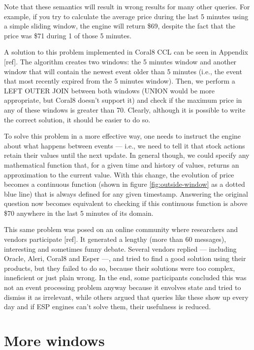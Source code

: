 \documentclass{report}
\begin{document}
Note that these semantics will result in wrong results for many other
queries. For example, if you try to calculate the average price during
the last 5 minutes using a simple sliding window, the engine will
return \$69, despite the fact that the price was \$71 during 1 of
those 5 minutes.

A solution to this problem implemented in Coral8 CCL can be seen in
Appendix [ref]. The algorithm creates two windows: the 5 minutes
window and another window that will contain the newest event older
than 5 minutes (i.e., the event that most recently expired from the 5
minutes window). Then, we perform a LEFT OUTER JOIN between both
windows (UNION would be more appropriate, but Coral8 doesn't support
it) and check if the maximum price in any of these windows is greater
than 70. Clearly, although it is possible to write the correct
solution, it should be easier to do so.

To solve this problem in a more effective way, one needs to instruct
the engine about what happens between events --- i.e., we need to tell
it that stock actions retain their values until the next update. In
general though, we could specify any mathematical function that, for a
given time and history of values, returns an approximation to the
current value. With this change, the evolution of price becomes a
continuous function (shown in figure \ref{fig:outside-window} as a
dotted blue line) that is always defined for any given
timestamp. Answering the original question now becomes equivalent to
checking if this continuous function is above \$70 anywhere in the
last 5 minutes of its domain.

This same problem was posed on an online community where researchers
and vendors participate [ref]. It generated a lengthy (more than 60
messages), interesting and sometimes funny debate. Several vendors
replied --- including Oracle, Aleri, Coral8 and Esper ---, and tried
to find a good solution using their products, but they failed to do
so, because their solutions were too complex, inneficient or just
plain wrong. In the end, some participants concluded this was not an
event processing problem anyway because it envolves state and tried to
dismiss it as irrelevant, while others argued that queries like these
show up every day and if ESP engines can't solve them, their
usefulness is reduced.

\section{More windows}
\end{document}
